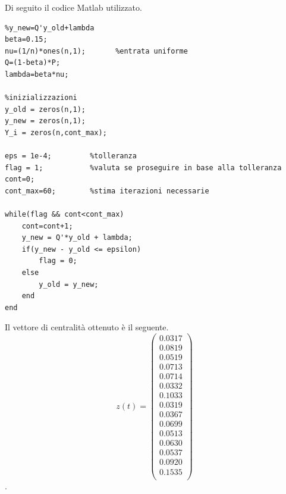 \documentclass[13pt,largemargins]{homework}
\begin{document}
\begin{enumerate}[label=(\alph*)]
Di seguito il codice Matlab utilizzato. 

\begin{lstlisting}
%y_new=Q'y_old+lambda
beta=0.15; 
nu=(1/n)*ones(n,1);       %entrata uniforme
Q=(1-beta)*P; 
lambda=beta*nu;

%inizializzazioni
y_old = zeros(n,1); 
y_new = zeros(n,1);
Y_i = zeros(n,cont_max); 

eps = 1e-4;         %tolleranza
flag = 1;           %valuta se proseguire in base alla tolleranza
cont=0; 
cont_max=60;       	%stima iterazioni necessarie

while(flag && cont<cont_max)
    cont=cont+1; 
    y_new = Q'*y_old + lambda;
    if(y_new - y_old <= epsilon)
        flag = 0; 
    else
        y_old = y_new; 
    end 
end
\end{lstlisting}

Il vettore di centralità ottenuto è il seguente.
\[z(t)=\begin{pmatrix}
0.0317\\ 
0.0819\\ 0.0519\\ 0.0713\\ 0.0714\\ 0.0332\\ 0.1033\\ 0.0319\\ 0.0367\\ 0.0699\\ 0.0513\\ 0.0630\\ 0.0537\\ 0.0920\\ 0.1535\\
\end{pmatrix}\]. 






\end{enumerate}
\end{document}
